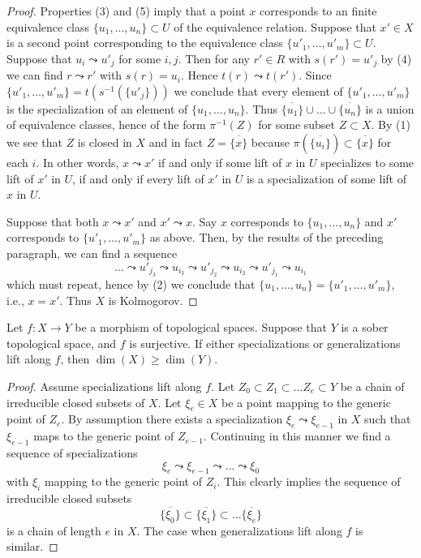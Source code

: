 \begin{proof}
Properties (3) and (5) imply that a point $x$ corresponds to an
finite equivalence class $\{u_1, \ldots, u_n\} \subset U$ of the equivalence
relation. Suppose that $x' \in X$ is a second point corresponding to
the equivalence class $\{u'_1, \ldots, u'_m\} \subset U$.
Suppose that $u_i \leadsto u'_j$ for some $i, j$. Then for any
$r' \in R$ with $s(r') = u'_j$ by (4) we can find $r \leadsto r'$
with $s(r) = u_i$. Hence $t(r) \leadsto t(r')$. Since
$\{u'_1, \ldots, u'_m\} = t(s^{-1}(\{u'_j\}))$ we conclude that
every element of $\{u'_1, \ldots, u'_m\}$ is the specialization of
an element of $\{u_1, \ldots, u_n\}$.
Thus $\overline{\{u_1\}} \cup \ldots \cup \overline{\{u_n\}}$ is
a union of equivalence classes, hence of the form $\pi^{-1}(Z)$
for some subset $Z \subset X$. By (1) we see that $Z$ is closed in $X$
and in fact $Z = \overline{\{x\}}$ because $\pi(\overline{\{u_i\}})
\subset \overline{\{x\}}$ for each $i$. In other words, $x \leadsto x'$
if and only if some lift of $x$ in $U$ specializes to some lift of
$x'$ in $U$, if and only if every lift of $x'$ in $U$ is a specialization
of some lift of $x$ in $U$.

\medskip\noindent
Suppose that both $x \leadsto x'$ and $x' \leadsto x$. Say $x$ corresponds
to $\{u_1, \ldots, u_n\}$ and $x'$ corresponds to $\{u'_1, \ldots, u'_m\}$
as above. Then, by the results of the preceding paragraph, we can find a
sequence
$$
\ldots \leadsto u'_{j_3} \leadsto u_{i_3} \leadsto u'_{j_2} \leadsto
u_{i_2} \leadsto u'_{j_1} \leadsto u_{i_1}
$$
which must repeat, hence by (2) we conclude that
$\{u_1, \ldots, u_n\} = \{u'_1, \ldots, u'_m\}$, i.e., $x = x'$.
Thus $X$ is Kolmogorov.
\end{proof}


\begin{lemma}
\label{lemma-dimension-specializations-lift}
Let $f : X \to Y$ be a morphism of topological spaces.
Suppose that $Y$ is a sober topological space, and $f$ is surjective.
If either specializations or generalizations lift along $f$, then
$\dim(X) \geq \dim(Y)$.
\end{lemma}

\begin{proof}
Assume specializations lift along $f$.
Let $Z_0 \subset Z_1 \subset \ldots Z_e \subset Y$ be a chain
of irreducible closed subsets of $X$. Let $\xi_e \in X$ be a point
mapping to the generic point of $Z_e$. By assumption there
exists a specialization
$\xi_e \leadsto \xi_{e - 1}$ in $X$ such that $\xi_{e - 1}$ maps to
the generic point of $Z_{e - 1}$. Continuing in this manner we find
a sequence of specializations
$$
\xi_e \leadsto \xi_{e - 1} \leadsto \ldots \leadsto \xi_0
$$
with $\xi_i$ mapping to the generic point of $Z_i$.
This clearly implies the sequence of irreducible closed
subsets
$$
\overline{\{\xi_0\}} \subset
\overline{\{\xi_1\}} \subset \ldots
\overline{\{\xi_e\}}
$$
is a chain of length $e$ in $X$.
The case when generalizations lift along $f$ is similar.
\end{proof}

